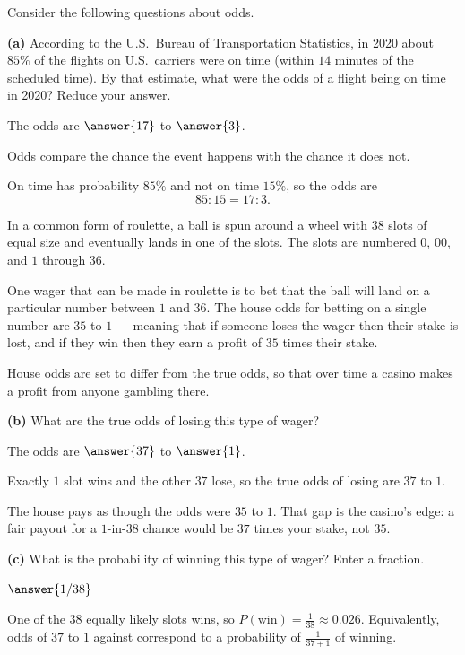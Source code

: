 \documentclass[12pt]{ximera}
\begin{document}
\begin{problem}
Consider the following questions about odds.

\begin{prompt}
\textbf{(a)} According to the U.S.\ Bureau of Transportation Statistics, in 2020 about
$85\%$ of the flights on U.S.\ carriers were on time (within $14$ minutes of the
scheduled time). By that estimate, what were the odds of a flight being on time in
2020? Reduce your answer.

The odds are $\answer{17}$ to $\answer{3}$.

\begin{hint}
Odds compare the chance the event happens with the chance it does not.
\end{hint}

\begin{feedback}
On time has probability $85\%$ and not on time $15\%$, so the odds are
\[ 85:15 = 17:3. \]
\end{feedback}
\end{prompt}

In a common form of roulette, a ball is spun around a wheel with $38$ slots of equal
size and eventually lands in one of the slots. The slots are numbered $0$, $00$, and $1$
through $36$.

One wager that can be made in roulette is to bet that the ball will land on a
particular number between $1$ and $36$. The house odds for betting on a single number
are $35$ to $1$ --- meaning that if someone loses the wager then their stake is lost, and
if they win then they earn a profit of $35$ times their stake.

House odds are set to differ from the true odds, so that over time a casino makes a
profit from anyone gambling there.

\begin{prompt}
\textbf{(b)} What are the true odds of losing this type of wager?

The odds are $\answer{37}$ to $\answer{1}$.

\begin{feedback}
Exactly $1$ slot wins and the other $37$ lose, so the true odds of losing are
$37$ to $1$.

The house pays as though the odds were $35$ to $1$. That gap is the casino's edge: a
fair payout for a $1$-in-$38$ chance would be $37$ times your stake, not $35$.
\end{feedback}
\end{prompt}

\begin{prompt}
\textbf{(c)} What is the probability of winning this type of wager? Enter a fraction.

$\answer{1/38}$

\begin{feedback}
One of the $38$ equally likely slots wins, so $P(\text{win})=\frac{1}{38}\approx 0.026$.
Equivalently, odds of $37$ to $1$ against correspond to a probability of
$\frac{1}{37+1}$ of winning.
\end{feedback}
\end{prompt}
\end{problem}
\end{document}
